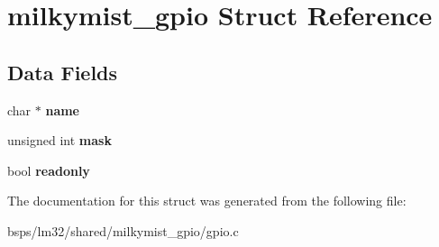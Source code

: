 \hypertarget{structmilkymist__gpio}{}\section{milkymist\+\_\+gpio Struct Reference}
\label{structmilkymist__gpio}
\subsection*{Data Fields}
\begin{DoxyCompactItemize}
\item 
\mbox{\label{structmilkymist__gpio_ab8e9422fbd41baae82129deb4513ea69}} 
char $\ast$ {\bfseries name}
\item 
\mbox{\label{structmilkymist__gpio_a3a132b2fb3011bd96d39952fc3449997}} 
unsigned int {\bfseries mask}
\item 
\mbox{\label{structmilkymist__gpio_ae89e6f3985a9cb7e0d1282ccd25b5c9e}} 
bool {\bfseries readonly}
\end{DoxyCompactItemize}


The documentation for this struct was generated from the following file\+:\begin{DoxyCompactItemize}
\item 
bsps/lm32/shared/milkymist\+\_\+gpio/gpio.\+c\end{DoxyCompactItemize}
